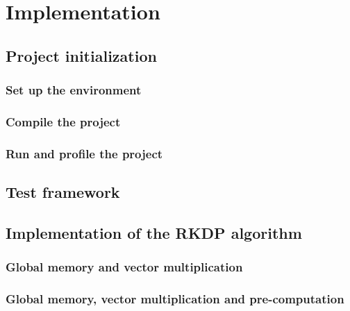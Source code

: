 \chapter{Implementation}
\label{ch:implementation}


\section{Project initialization}
\label{ch:implementation:initialization}

\subsection{Set up the environment}
\label{ch:implementation:initialization:environment}

\subsection{Compile the project}
\label{ch:implementation:initialization:compile}

\subsection{Run and profile the project}
\label{ch:implementation:initialization:run}



\section{Test framework}
\label{ch:implementation:test}



\section{Implementation of the RKDP algorithm}
\label{ch:implementation:rkdp}

\subsection{Global memory and vector multiplication}
\label{ch:implementation:rkdp:global-vecmult}

\subsection{Global memory, vector multiplication and pre-computation}
\label{ch:implementation:rkdp:global-vecmult-precomp}

